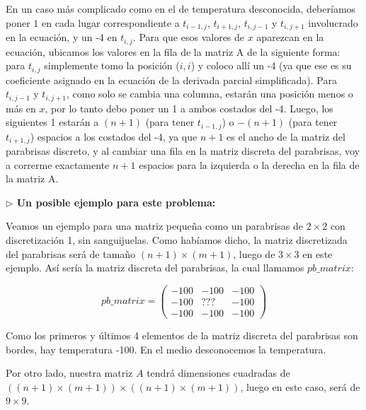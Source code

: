En un caso más complicado como en el de temperatura desconocida, deberíamos poner $1$ en cada lugar correspondiente a $t_{i-1,j}$, $t_{i+1,j}$, $t_{i,j-1}$ y $t_{i,j+1}$ involucrado en la ecuación, y un -4 en $t_{i,j}$. Para que esos valores de $x$ aparezcan en la ecuación, ubicamos los valores en la fila de la matriz A de la siguiente forma: para $t_{i,j}$ simplemente tomo la posición ($i,i$) y coloco allí un -4 (ya que ese es su coeficiente asignado en la ecuación de la derivada parcial simplificada). Para $t_{i,j-1}$ y $t_{i,j+1}$, como solo se cambia una columna, estarán una posición menos o más en $x$, por lo tanto debo poner un 1 a ambos costados del -4. Luego, los siguientes 1 estarán a $(n+1)$ (para tener $t_{i-1,j}$) o $-(n+1)$ (para tener $t_{i+1,j}$) espacios a los costados del -4, ya que $n+1$ es el ancho de la matriz del parabrisas discreto, y al cambiar una fila en la matriz discreta del parabrisas, voy a correrme exactamente $n+1$ espacios para la izquierda o la derecha en la fila de la matriz A.

\vspace{\baselineskip}

\vspace{\baselineskip}

{\large \textbf{ $\rhd$ Un posible ejemplo para este problema:}}

\vspace{\baselineskip}

Veamos un ejemplo para una matriz pequeña como un parabrisas de $2 \times 2$ con discretización 1, sin sanguijuelas. Como habíamos dicho, la matriz discretizada del parabrisas será de tamaño $(n+1) \times (m+1)$, luego de $3 \times 3$ en este ejemplo. Así sería la matriz discreta del parabrisas, la cual llamamos $pb\_matrix$: 

\vspace{\baselineskip}

\[ pb\_matrix = \left( \begin{array}{ccc}
-100 & -100 & -100 \\
-100 & ??? & -100 \\
-100 & -100 & -100 
\end{array} \right)\] 

\vspace{\baselineskip}

Como los primeros y últimos 4 elementos de la matriz discreta del parabrisas son bordes, hay temperatura -100. En el medio desconocemos la temperatura.

Por otro lado, nuestra matriz $A$ tendrá dimensiones cuadradas de $((n+1) \times (m+1)) \times  ((n+1) \times (m+1))$, luego en este caso, será de $9 \times 9$.

